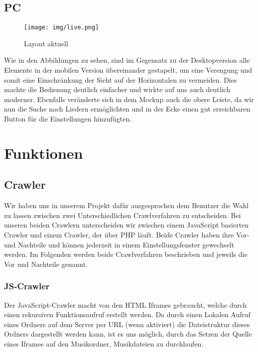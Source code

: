 \documentclass{article}
\begin{document}
\subsection{PC}
\begin{figure}[H]
 \centering
 \texttt{[image: img/live.png]}
 \caption{Layout aktuell}
 \label{fig:layout}
\end{figure}

Wie in den Abbildungen zu sehen, sind im Gegensatz zu der Desktopversion alle Elemente in der mobilen Version übereinander gestapelt, um eine Verengung und somit eine Einschränkung der Sicht auf der Horizontalen zu vermeiden. Dies machte die Bedienung deutlich einfacher und wirkte auf uns auch deutlich moderner. Ebenfalls veränderte sich in dem Mockup auch die obere Leiste, da wir nun die Suche nach Liedern ermöglichten und in der Ecke einen gut erreichbaren Button für die Einstellungen hinzufügten.
\section{Funktionen}

\subsection{Crawler}
Wir haben uns in unserem Projekt dafür ausgesprochen dem Benutzer die Wahl zu lassen zwischen zwei Unterschiedlichen Crawlverfahren zu entscheiden. Bei unseren beiden Crawlern unterscheiden wir zwischen einem JavaScript basierten Crawler und einem Crawler, der über PHP läuft. 
Beide Crawler haben ihre Vor- und Nachteile und können jederzeit in einem Einstellungsfenster gewechselt werden.
Im Folgenden werden beide Crawlverfahren beschrieben und jeweils die Vor und Nachteile genannt.
\subsubsection{JS-Crawler}
Der JavaScript-Crawler macht von den HTML Iframes gebraucht, welche durch einen rekursiven Funktionsaufruf erstellt werden. Da durch einen Lokalen Aufruf eines Ordners auf dem Server per URL (wenn aktiviert) die Dateistruktur dieses Ordners dargestellt werden kann, ist es uns möglich, durch das Setzen der Quelle eines Iframes auf den Musikordner, Musikdateien zu durchlaufen. \newline
\end{document}
